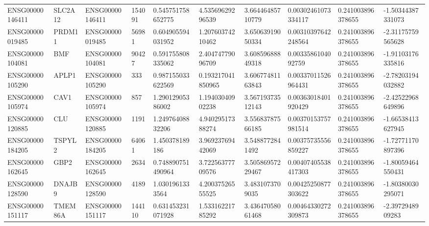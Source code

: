 \begin{tabular}{@{}llllllllll@{}}
ENSG00000146411 & SLC2A12 & ENSG00000146411 & 154091 & 0.545751758652775 & 4.53569629296539 & 3.66446485710779 & 0.00302461073334117 & 0.241003896378655 & -1.50344387331073 \\
ENSG00000019485 & PRDM11 & ENSG00000019485 & 56981 & 0.604905594031952 & 1.20760374210462 & 3.65063919050334 & 0.00310397642248564 & 0.241003896378655 & -2.31175759565628 \\
ENSG00000104081 & BMF & ENSG00000104081 & 90427 & 0.591755808335062 & 2.40474779096709 & 3.60859688849318 & 0.0033586104092759 & 0.241003896378655 & -1.91103176335816 \\
ENSG00000105290 & APLP1 & ENSG00000105290 & 333 & 0.987155033622569 & 0.193217041850965 & 3.60677481163843 & 0.00337011526964431 & 0.241003896378655 & -2.78203194032882 \\
ENSG00000105974 & CAV1 & ENSG00000105974 & 857 & 1.29012905386002 & 1.19403040902238 & 3.56719373512143 & 0.00363018401920429 & 0.241003896378655 & -2.42522968649896 \\
ENSG00000120885 & CLU & ENSG00000120885 & 1191 & 1.24976408832206 & 4.94029517388274 & 3.55683787566185 & 0.00370153757981514 & 0.241003896378655 & -1.66538413627945 \\
ENSG00000184205 & TSPYL2 & ENSG00000184205 & 64061 & 1.450378189186 & 3.96923769442069 & 3.5488772841492 & 0.00375735556859227 & 0.241003896378655 & -1.72771170897396 \\
ENSG00000162645 & GBP2 & ENSG00000162645 & 2634 & 0.748890751490964 & 3.72256377709576 & 3.50586957229467 & 0.00407405538417303 & 0.241003896378655 & -1.80059464550431 \\
ENSG00000128590 & DNAJB9 & ENSG00000128590 & 4189 & 1.0301961333564 & 4.20037526555525 & 3.4831073709035 & 0.00425250877303622 & 0.241003896378655 & -1.80380030295071 \\
ENSG00000151117 & TMEM86A & ENSG00000151117 & 144110 & 0.631453231071928 & 1.53316221785292 & 3.43647058061468 & 0.00464330272309873 & 0.241003896378655 & -2.3972948909283 \\
\bottomrule
\end{tabular}
\endgroup
